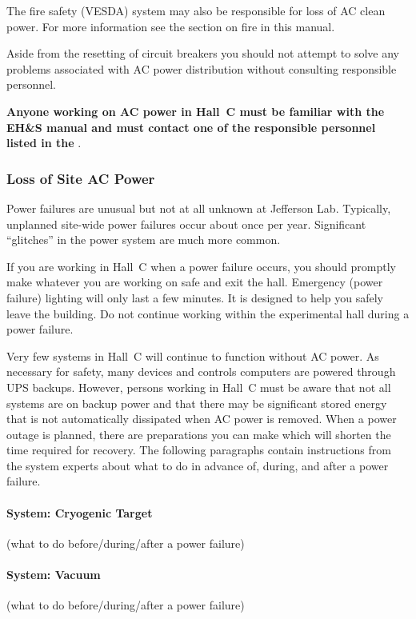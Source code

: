 The fire safety (VESDA) system may also be responsible for loss of AC
clean power. For more information see the section on fire in this
manual.

Aside from the resetting of circuit breakers you should not attempt
to solve any problems associated with AC power distribution without
consulting responsible personnel.

{\bf Anyone working on AC power in Hall~C must be familiar with
the EH\&S manual and must contact one of the responsible personnel listed
in the }.

\subsubsection{Loss of Site AC Power}

Power failures are unusual but not at all unknown at Jefferson Lab. Typically,
unplanned site-wide power failures occur about once per year. Significant
``glitches'' in the power system are much more common.

If you are working in Hall~C when a power failure occurs, you should
promptly make whatever you are working on safe and exit the hall. Emergency
(power failure) lighting will only last a few minutes. It is designed to
help you safely leave the building. Do not continue working within the
experimental hall during a power failure.

Very few systems in Hall~C will continue to function without AC power. As
necessary for safety, many devices and controls computers are powered through
UPS backups. However, persons working in Hall~C must be aware that not all
systems are on backup power and that there may be significant stored energy
that is not automatically dissipated when AC power is removed. When a 
power outage is planned, there are preparations you can make which will
shorten the time required for recovery. The following paragraphs contain
instructions from the system experts about what to do in advance of, during,
and after a power failure.

\paragraph {System: Cryogenic Target}
(what to do before/during/after a power failure)

\paragraph {System: Vacuum}
(what to do before/during/after a power failure)

